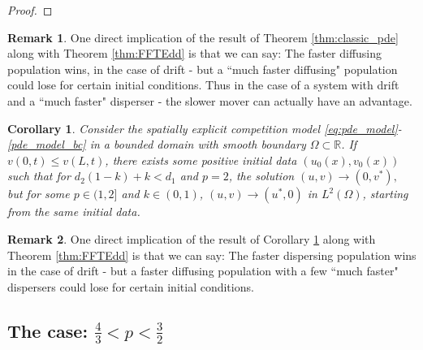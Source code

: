 \documentclass[10pt]{amsart}
\theoremstyle{plain}
\newtheorem{corollary}{Corollary}
\theoremstyle{definition}
\newtheorem{remark}{Remark}
\begin{document}
\begin{proof}

\end{proof}



























\begin{remark}
One direct implication of the result of Theorem \ref{thm:classic_pde} along with Theorem \ref{thm:FFTEdd} is that we can say:
The faster diffusing population wins, in the case of drift - but a ``much faster diffusing" population could lose for certain initial conditions. Thus in the case of a system with drift and a ``much faster" disperser - the slower mover can actually have an advantage.
\end{remark}

\begin{corollary}\label{cor:FFTEddc}
Consider the spatially explicit competition model \eqref{eq:pde_model}-\eqref{pde_model_bc} in a bounded domain with smooth boundary $\Omega \subset \mathbb{R}$. If $v(0,t) \leq v(L,t)$, there exists some positive initial data $(u_0(x),v_0(x))$ such that for $d_2(1-k) + k < d_1$ and $p=2$, the solution $(u,v) \to (0,v^{*}),$ but for some $p \in(1,2]$ and $k\in (0,1)$, $ (u,v) \to (u^{*},0)$ in $L^{2}(\Omega)$, starting from the same initial data. 
\end{corollary}

\begin{remark}
One direct implication of the result of Corollary  \ref{cor:FFTEddc} along with Theorem \ref{thm:FFTEdd} is that we can say:
The faster dispersing population wins in the case of drift - but a faster diffusing population with a few ``much faster" dispersers could lose for certain initial conditions. 
\end{remark}

\subsection{The case: $\frac{4}{3} < p <\frac{3}{2} $}
\end{document}
